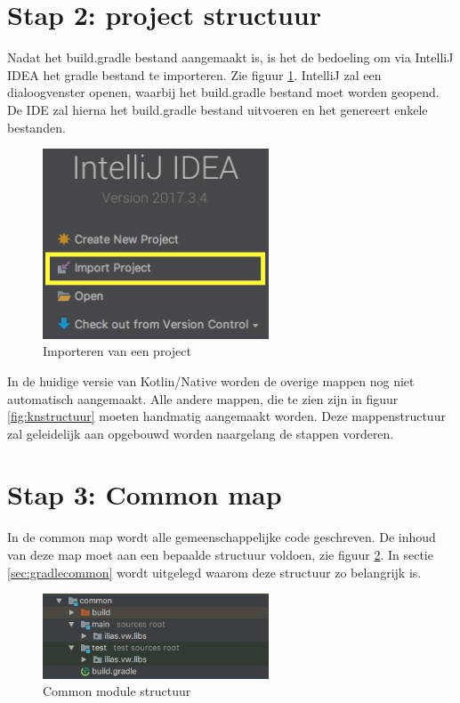 \section{Stap 2: project structuur}
Nadat het build.gradle bestand aangemaakt is, is het de bedoeling om via IntelliJ IDEA het gradle bestand te importeren. Zie figuur \ref{fig:stap2-import}. IntelliJ zal een dialoogvenster openen, waarbij het build.gradle bestand moet worden geopend. De IDE zal hierna het build.gradle bestand uitvoeren en het genereert enkele bestanden.

\begin{figure} [ht]
	\centering
	\includegraphics[width=0.60\textwidth]{img/stap2-import.png}
	\caption{Importeren van een project}
	\label{fig:stap2-import}
\end{figure}

In de huidige versie van Kotlin/Native worden de overige mappen nog niet automatisch aangemaakt. Alle andere mappen, die te zien zijn in figuur \ref{fig:knstructuur} moeten handmatig aangemaakt worden. Deze mappenstructuur zal geleidelijk aan opgebouwd worden naargelang de stappen vorderen.

\section{Stap 3: Common map }
In de common map wordt alle gemeenschappelijke code geschreven. De inhoud van deze map moet aan een bepaalde structuur voldoen, zie figuur \ref{fig:stap3-common}. In sectie \ref{sec:gradlecommon} wordt uitgelegd waarom deze structuur zo belangrijk is.

\begin{figure} [ht]
	\centering
	\includegraphics[width=0.60\textwidth]{img/stap3-common.png}
	\caption{Common module structuur}
	\label{fig:stap3-common}
\end{figure}

